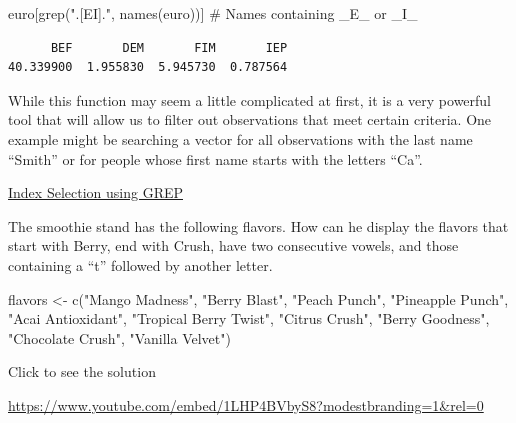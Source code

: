 \documentclass[
  letterpaper,
  DIV=11,
  numbers=noendperiod]{scrreprt}
\newenvironment{Shaded}{\begin{snugshade}}{\end{snugshade}}
\newcommand{\CommentTok}[1]{\textcolor[rgb]{0.37,0.37,0.37}{#1}}
\newcommand{\FunctionTok}[1]{\textcolor[rgb]{0.28,0.35,0.67}{#1}}
\newcommand{\NormalTok}[1]{\textcolor[rgb]{0.00,0.23,0.31}{#1}}
\newcommand{\OtherTok}[1]{\textcolor[rgb]{0.00,0.23,0.31}{#1}}
\newcommand{\StringTok}[1]{\textcolor[rgb]{0.13,0.47,0.30}{#1}}
\begin{document}
\begin{Shaded}
\begin{Highlighting}[]
\NormalTok{euro[}\FunctionTok{grep}\NormalTok{(}\StringTok{".[EI]."}\NormalTok{, }\FunctionTok{names}\NormalTok{(euro))] }\CommentTok{\# Names containing \_E\_ or \_I\_}
\end{Highlighting}
\end{Shaded}

\begin{verbatim}
      BEF       DEM       FIM       IEP 
40.339900  1.955830  5.945730  0.787564 
\end{verbatim}

While this function may seem a little complicated at first, it is a very
powerful tool that will allow us to filter out observations that meet
certain criteria. One example might be searching a vector for all
observations with the last name ``Smith'' or for people whose first name
starts with the letters ``Ca''.

\begin{watch}{}{}
    \href{https://youtu.be/BDRppgPi8-E}{Index Selection using GREP}
\end{watch}

\begin{tcolorbox}[enhanced jigsaw, colframe=quarto-callout-tip-color-frame, colback=white, breakable, rightrule=.15mm, title=\textcolor{quarto-callout-tip-color}{\faLightbulb}\hspace{0.5em}{Try it Out}, bottomtitle=1mm, toptitle=1mm, titlerule=0mm, left=2mm, coltitle=black, colbacktitle=quarto-callout-tip-color!10!white, leftrule=.75mm, opacitybacktitle=0.6, bottomrule=.15mm, opacityback=0, arc=.35mm, toprule=.15mm]

The smoothie stand has the following flavors. How can he display the
flavors that start with Berry, end with Crush, have two consecutive
vowels, and those containing a ``t'' followed by another letter.

\begin{Shaded}
\begin{Highlighting}[]
\NormalTok{flavors }\OtherTok{\textless{}{-}} \FunctionTok{c}\NormalTok{(}\StringTok{"Mango Madness"}\NormalTok{, }\StringTok{"Berry Blast"}\NormalTok{, }\StringTok{"Peach Punch"}\NormalTok{, }\StringTok{"Pineapple Punch"}\NormalTok{, }
             \StringTok{"Acai Antioxidant"}\NormalTok{, }\StringTok{"Tropical Berry Twist"}\NormalTok{, }\StringTok{"Citrus Crush"}\NormalTok{, }
             \StringTok{"Berry Goodness"}\NormalTok{, }\StringTok{"Chocolate Crush"}\NormalTok{, }\StringTok{"Vanilla Velvet"}\NormalTok{)}
\end{Highlighting}
\end{Shaded}

Click to see the solution

\url{https://www.youtube.com/embed/1LHP4BVbyS8?modestbranding=1&rel=0}

\end{tcolorbox}
\end{document}
